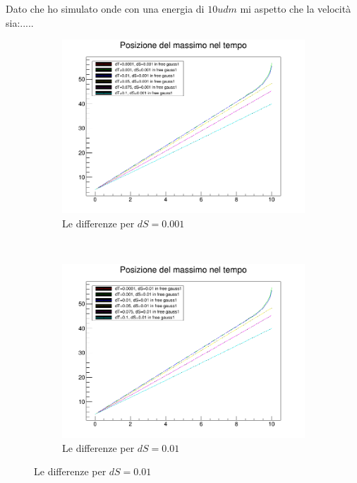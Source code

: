 Dato che ho simulato onde con una energia di $10 udm$ mi aspetto che la velocit\`a sia:.....%

\begin{figure}[h]
	\centering
\begin{subfigure}[b]{0.49\textwidth}
\includegraphics[width=\textwidth]{IMG/v_g1_0001}
\caption[Differenze in 0.001]{Le differenze per $dS = 0.001$}
\end{subfigure}
~
\begin{subfigure}[b]{0.49\textwidth}
\includegraphics[width=\textwidth]{IMG/v_g1_001}
\caption[Differenze in 0.01]{Le differenze per $dS = 0.01$}
\end{subfigure}


\end{figure}
